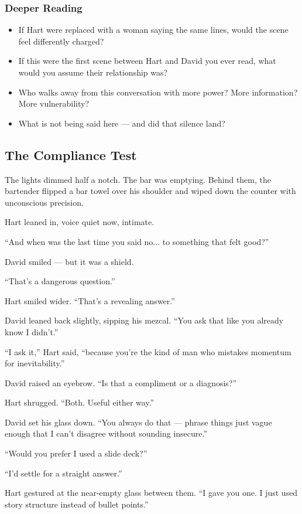 \subsubsection{Deeper Reading}
\begin{itemize}
    \item If Hart were replaced with a woman saying the same lines, would the scene feel differently charged?
    \item If this were the first scene between Hart and David you ever read, what would you assume their relationship was?
    \item Who walks away from this conversation with more power? More information? More vulnerability?
    \item What is not being said here — and did that silence land?
\end{itemize}


\subsection{The Compliance Test}


The lights dimmed half a notch. The bar was emptying. Behind them, the bartender flipped a bar towel over his shoulder and wiped down the counter with unconscious precision.

Hart leaned in, voice quiet now, intimate.

“And when was the last time you said no... to something that felt good?”

David smiled — but it was a shield.

“That’s a dangerous question.”

Hart smiled wider. “That’s a revealing answer.”

David leaned back slightly, sipping his mezcal. “You ask that like you already know I didn’t.”

“I ask it,” Hart said, “because you’re the kind of man who mistakes momentum for inevitability.”

David raised an eyebrow. “Is that a compliment or a diagnosis?”

Hart shrugged. “Both. Useful either way.”

David set his glass down. “You always do that — phrase things just vague enough that I can't disagree without sounding insecure.”

“Would you prefer I used a slide deck?”

“I’d settle for a straight answer.”

Hart gestured at the near-empty glass between them. “I gave you one. I just used story structure instead of bullet points.”

